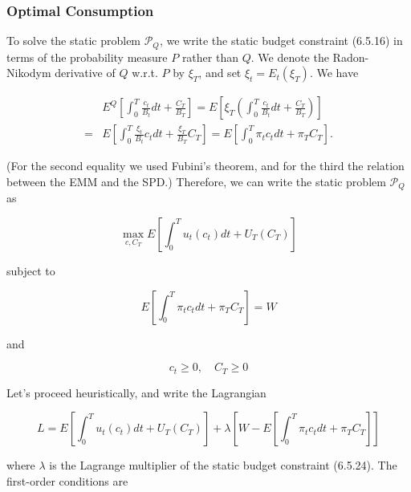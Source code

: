 \documentclass[\topdir/lecture\_notes.tex]{subfiles}
\begin{document}
\subsubsection{Optimal Consumption}
To solve the static problem \(\mathcal{P}_{Q}\), we write the static budget constraint (6.5.16) in terms of the probability measure \(P\) rather than \(Q\). We denote the Radon-Nikodym derivative of \(Q\) w.r.t. \(P\) by \(\xi_{T}\), and set \(\xi_{t}=E_{t}\left(\xi_{T}\right)\). We have

\begin{equation}
\begin{aligned}
& E^{Q}\left[\int_{0}^{T} \frac{c_{t}}{B_{t}} d t+\frac{C_{T}}{B_{T}}\right]=E\left[\xi_{T}\left(\int_{0}^{T} \frac{c_{t}}{B_{t}} d t+\frac{C_{T}}{B_{T}}\right)\right] \\
= & E\left[\int_{0}^{T} \frac{\xi_{t}}{B_{t}} c_{t} d t+\frac{\xi_{T}}{B_{T}} C_{T}\right]=E\left[\int_{0}^{T} \pi_{t} c_{t} d t+\pi_{T} C_{T}\right] .
\end{aligned}
\end{equation}

(For the second equality we used Fubini's theorem, and for the third the relation between the EMM and the SPD.) Therefore, we can write the static problem \(\mathcal{P}_{Q}\) as

\begin{equation}
\max _{c, C_{T}} E\left[\int_{0}^{T} u_{t}\left(c_{t}\right) d t+U_{T}\left(C_{T}\right)\right]
\end{equation}

subject to

\begin{equation}
E\left[\int_{0}^{T} \pi_{t} c_{t} d t+\pi_{T} C_{T}\right]=W \label{eq:6.5.24}
\end{equation}

and

\begin{equation}
c_{t} \geq 0, \quad C_{T} \geq 0
\end{equation}

Let's proceed heuristically, and write the Lagrangian

\begin{equation}
L=E\left[\int_{0}^{T} u_{t}\left(c_{t}\right) d t+U_{T}\left(C_{T}\right)\right]+\lambda\left[W-E\left[\int_{0}^{T} \pi_{t} c_{t} d t+\pi_{T} C_{T}\right]\right]
\end{equation}

where \(\lambda\) is the Lagrange multiplier of the static budget constraint (6.5.24). The first-order conditions are
\end{document}
